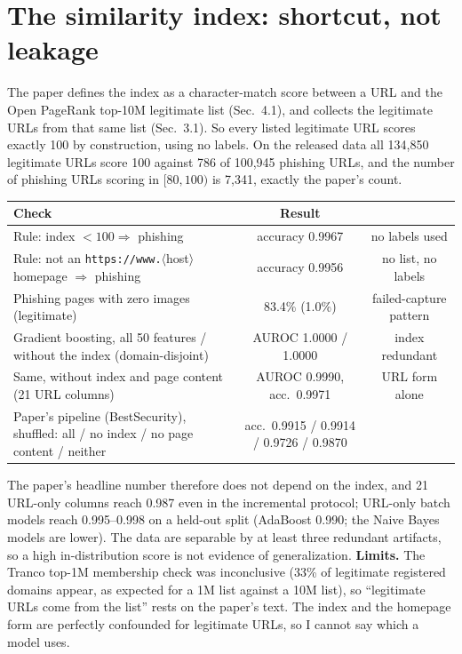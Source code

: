 \documentclass[10pt]{article}
\newcommand{\tsz}{\footnotesize}
\begin{document}
\section{The similarity index: shortcut, not leakage}
The paper defines the index as a character-match score between a URL and the Open PageRank top-10M legitimate list (Sec.\ 4.1), and collects the legitimate URLs from that same list (Sec.\ 3.1). So every listed legitimate URL scores exactly 100 by construction, using no labels. On the released data all 134,850 legitimate URLs score 100 against 786 of 100,945 phishing URLs, and the number of phishing URLs scoring in $[80,100)$ is 7,341, exactly the paper's count.
\begin{center}
\tsz
\begin{tabular}{@{}lcc@{}}
\toprule
Check & Result & \\
\midrule
Rule: index $<100\Rightarrow$ phishing & accuracy 0.9967 & no labels used \\
Rule: not an \texttt{https://www.}$\langle$host$\rangle$ homepage $\Rightarrow$ phishing & accuracy 0.9956 & no list, no labels \\
Phishing pages with zero images (legitimate) & 83.4\% (1.0\%) & failed-capture pattern \\
Gradient boosting, all 50 features / without the index (domain-disjoint) & AUROC 1.0000 / 1.0000 & index redundant \\
Same, without index and page content (21 URL columns) & AUROC 0.9990, acc.\ 0.9971 & URL form alone \\
Paper's pipeline (BestSecurity), shuffled: all / no index / no page content / neither & acc.\ 0.9915 / 0.9914 / 0.9726 / 0.9870 & \\
\bottomrule
\end{tabular}
\end{center}
The paper's headline number therefore does not depend on the index, and 21 URL-only columns reach 0.987 even in the incremental protocol; URL-only batch models reach 0.995--0.998 on a held-out split (AdaBoost 0.990; the Naive Bayes models are lower). The data are separable by at least three redundant artifacts, so a high in-distribution score is not evidence of generalization. \textbf{Limits.} The Tranco top-1M membership check was inconclusive (33\% of legitimate registered domains appear, as expected for a 1M list against a 10M list), so ``legitimate URLs come from the list'' rests on the paper's text. The index and the homepage form are perfectly confounded for legitimate URLs, so I cannot say which a model uses.
\end{document}
